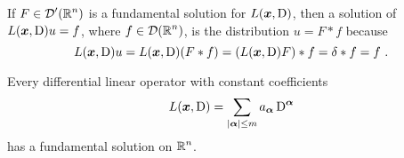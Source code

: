 \begin{rmk}
If $\displaystyle F\in \mathcal{D}'(\mathbb{R}^n)$ is a fundamental solution for
$L({\bm{x}},\operatorname{D})$, then a solution of $L({\bm{x}},\operatorname{D})u = f$, where
$\displaystyle f \in \mathcal{D}(\mathbb{R}^n)$, is the 
distribution $u = F \ast f$ because
\[
L({\bm{x}},\operatorname{D}) u = L({\bm{x}},\operatorname{D})(F \ast f)
= (L({\bm{x}},\operatorname{D}) F) \ast f = \delta \ast f = f \ .
\]
\end{rmk}

\begin{theorem} \label{malgr_Ehr}
Every differential linear operator with constant coefficients
\begin{equation} \label{distr_lPDE4}
L({\bm{x}},\operatorname{D}) = \sum_{|{\bm{\alpha}}|\leq m} a_{{\bm{\alpha}}} \operatorname{D}^{{\bm{\alpha}}}
\end{equation}
has a fundamental solution on $\displaystyle \mathbb{R}^n$.
\end{theorem}

